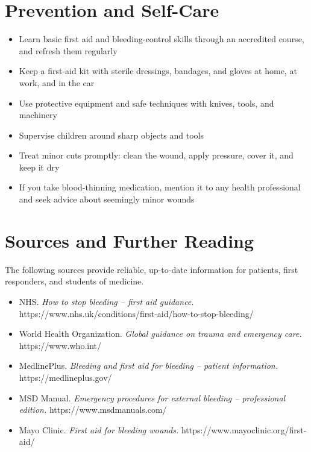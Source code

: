 \section*{Prevention and Self-Care}
\begin{itemize}
    \item Learn basic first aid and bleeding-control skills through an accredited course, and refresh them regularly
    \item Keep a first-aid kit with sterile dressings, bandages, and gloves at home, at work, and in the car
    \item Use protective equipment and safe techniques with knives, tools, and machinery
    \item Supervise children around sharp objects and tools
    \item Treat minor cuts promptly: clean the wound, apply pressure, cover it, and keep it dry
    \item If you take blood-thinning medication, mention it to any health professional and seek advice about seemingly minor wounds
\end{itemize}

\section*{Sources and Further Reading}
The following sources provide reliable, up-to-date information for patients, first responders, and students of medicine.

\begin{itemize}
    \item NHS. \textit{How to stop bleeding -- first aid guidance.} https://www.nhs.uk/conditions/first-aid/how-to-stop-bleeding/
    \item World Health Organization. \textit{Global guidance on trauma and emergency care.} https://www.who.int/
    \item MedlinePlus. \textit{Bleeding and first aid for bleeding -- patient information.} https://medlineplus.gov/
    \item MSD Manual. \textit{Emergency procedures for external bleeding -- professional edition.} https://www.msdmanuals.com/
    \item Mayo Clinic. \textit{First aid for bleeding wounds.} https://www.mayoclinic.org/first-aid/
\end{itemize}
